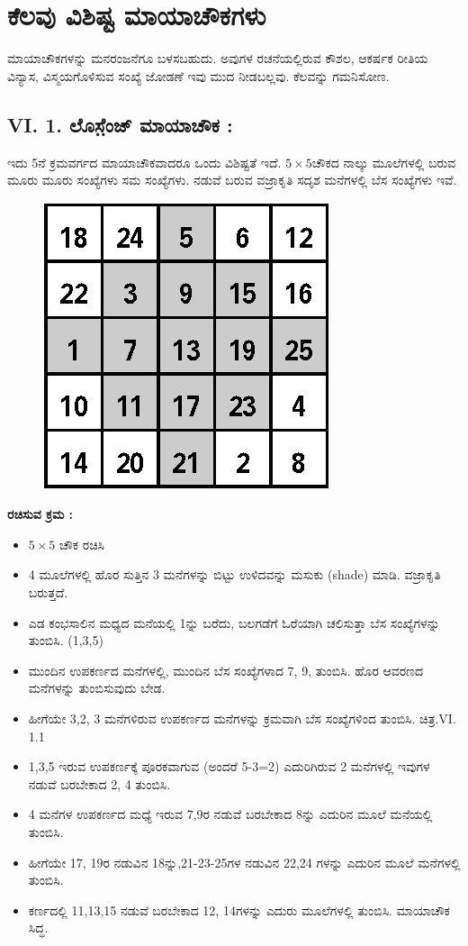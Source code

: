 
\chapter{ಕೆಲವು ವಿಶಿಷ್ಟ ಮಾಯಾಚೌಕಗಳು}

ಮಾಯಾಚೌಕಗಳನ್ನು ಮನರಂಜನೆಗೂ ಬಳಸಬಹುದು. ಅವುಗಳ ರಚನೆಯಲ್ಲಿರುವ ಕೌಶಲ, ಆಕರ್ಷಕ ರೀತಿಯ ವಿನ್ಯಾಸ, ವಿಸ್ಮಯಗೊಳಿಸುವ ಸಂಖ್ಯೆ ಜೋಡಣೆ ಇವು ಮುದ ನೀಡಬಲ್ಲವು. ಕೆಲವನ್ನು ಗಮನಿಸೋಣ.

\section*{VI. 1. ಲೊಸೆ಼ಂಜ್ ಮಾಯಾಚೌಕ :}

ಇದು 5ನೆ ಕ್ರಮವರ್ಗದ ಮಾಯಾಚೌಕವಾದರೂ ಒಂದು ವಿಶಿಷ್ಟತೆ ಇದೆ. $5 \times 5$ಚೌಕದ ನಾಲ್ಕು ಮೂಲೆಗಳಲ್ಲಿ ಬರುವ ಮೂರು ಮೂರು ಸಂಖ್ಯೆಗಳು ಸಮ ಸಂಖ್ಯೆಗಳು. ನಡುವೆ ಬರುವ ವಜ್ರಾಕೃತಿ ಸದೃಶ ಮನೆಗಳಲ್ಲಿ ಬೆಸ ಸಂಖ್ಯೆಗಳು ಇವೆ.
\begin{figure}[H]
\includegraphics{src/figures/chap5/fig5-1.eps}
\end{figure}

\textbf{ರಚಿಸುವ ಕ್ರಮ :}
\begin{itemize}
	\item $5 \times 5$ ಚೌಕ ರಚಿಸಿ
	\item 4 ಮೂಲೆಗಳಲ್ಲಿ ಹೊರ ಸುತ್ತಿನ 3 ಮನೆಗಳನ್ನು ಬಿಟ್ಟು ಉಳಿದವನ್ನು ಮಸುಕು (shade) ಮಾಡಿ. ವಜ್ರಾಕೃತಿ ಬರುತ್ತದೆ.
	\item ಎಡ ಕಂಭಸಾಲಿನ ಮಧ್ಯದ ಮನೆಯಲ್ಲಿ 1ನ್ನು ಬರೆದು, ಬಲಗಡೆಗೆ ಓರೆಯಾಗಿ ಚಲಿಸುತ್ತಾ ಬೆಸ ಸಂಖ್ಯೆಗಳನ್ನು ತುಂಬಿಸಿ. (1,3,5)
	\item ಮುಂದಿನ ಉಪಕರ್ಣದ ಮನೆಗಳಲ್ಲಿ, ಮುಂದಿನ ಬೆಸ ಸಂಖ್ಯೆಗಳಾದ 7, 9, ತುಂಬಿಸಿ. ಹೊರ ಆವರಣದ ಮನೆಗಳನ್ನು ತುಂಬಿಸುವುದು ಬೇಡ.
	\item ಹೀಗೆಯೇ 3,2, 3 ಮನೆಗಳಿರುವ ಉಪಕರ್ಣದ ಮನೆಗಳನ್ನು ಕ್ರಮವಾಗಿ ಬೆಸ ಸಂಖ್ಯೆಗಳಿಂದ ತುಂಬಿಸಿ. ಚಿತ್ರ.VI. 1.1
	\item 1,3,5 ಇರುವ ಉಪಕರ್ಣಕ್ಕೆ ಪೂರಕವಾಗುವ (ಅಂದರೆ 5-3=2) ಎದುರಿಗಿರುವ 2 ಮನೆಗಳಲ್ಲಿ ಇವುಗಳ ನಡುವೆ ಬರಬೇಕಾದ 2, 4 ತುಂಬಿಸಿ.
	\item 4 ಮನೆಗಳ ಉಪಕರ್ಣದ ಮಧ್ಯೆ ಇರುವ 7,9ರ ನಡುವೆ ಬರಬೇಕಾದ 8ನ್ನು ಎದುರಿನ ಮೂಲೆ ಮನೆಯಲ್ಲಿ ತುಂಬಿಸಿ.
	\item ಹೀಗೆಯೇ 17, 19ರ ನಡುವಿನ 18ನ್ನು,21-23-25ಗಳ ನಡುವಿನ 22,24 ಗಳನ್ನು ಎದುರಿನ ಮೂಲೆ ಮನೆಗಳಲ್ಲಿ ತುಂಬಿಸಿ.
	\item ಕರ್ಣದಲ್ಲಿ 11,13,15 ನಡುವೆ ಬರಬೇಕಾದ 12, 14ಗಳನ್ನು ಎದುರು ಮೂಲೆಗಳಲ್ಲಿ ತುಂಬಿಸಿ. ಮಾಯಾಚೌಕ ಸಿದ್ಧ.
\end{itemize}

